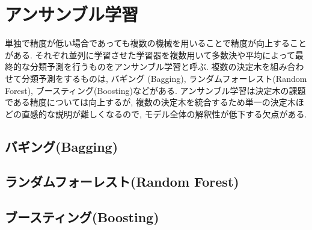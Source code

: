 \documentclass[dvipdfmx, 10pt]{jsarticle}
\begin{document}
\section*{アンサンブル学習}
単独で精度が低い場合であっても複数の機械を用いることで精度が向上することがある. 
それぞれ並列に学習させた学習器を複数用いて多数決や平均によって最終的な分類予測を行うものをアンサンブル学習と呼ぶ. 
複数の決定木を組み合わせて分類予測をするものは, 
バギング (Bagging), ランダムフォーレスト(Random Forest), ブースティング(Boosting)などがある. 
アンサンブル学習は決定木の課題である精度については向上するが, 
複数の決定木を統合するため単一の決定木ほどの直感的な説明が難しくなるので, モデル全体の解釈性が低下する欠点がある. 

\subsection*{バギング(Bagging)}

\subsection*{ランダムフォーレスト(Random Forest)}

\subsection*{ブースティング(Boosting)}
\end{document}
